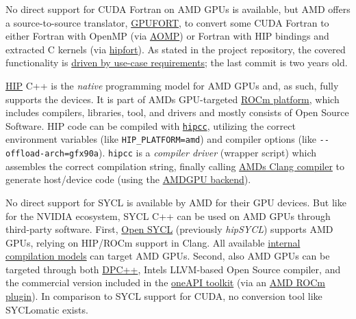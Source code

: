  No direct support for CUDA Fortran on AMD GPUs is available, but AMD offers a source-to-source translator, \href{https://github.com/ROCmSoftwarePlatform/gpufort}{GPUFORT}, to convert some CUDA Fortran to either Fortran with OpenMP (via \href{https://github.com/ROCm-Developer-Tools/aomp}{AOMP}) or Fortran with HIP bindings and extracted C kernels (via \href{https://github.com/ROCmSoftwarePlatform/hipfort}{hipfort}). As stated in the project repository, the covered functionality is \href{https://github.com/ROCmSoftwarePlatform/gpufort\#limitations}{driven by use-case requirements}; the last commit is two years old.   

 \href{https://github.com/ROCm-Developer-Tools/HIP}{HIP} C++ is the \emph{native} programming model for AMD GPUs and, as such, fully supports the devices. It is part of AMD\textquotesingle s GPU-targeted \href{https://rocm.docs.amd.com/en/latest/}{ROCm platform}, which includes compilers, libraries, tool, and drivers and mostly consists of Open Source Software. HIP code can be compiled with \href{https://github.com/ROCm-Developer-Tools/HIPCC}{\texttt{hipcc}}, utilizing the correct environment variables (like \texttt{HIP\_PLATFORM=amd}) and compiler options (like \texttt{-\/-offload-arch=gfx90a}). \texttt{hipcc} is a \emph{compiler driver} (wrapper script) which assembles the correct compilation string, finally calling \href{https://github.com/RadeonOpenCompute/llvm-project}{AMD\textquotesingle s Clang compiler} to generate host/device code (using the \href{https://llvm.org/docs/AMDGPUUsage.html}{AMDGPU backend}).   

 No direct support for SYCL is available by AMD for their GPU devices. But like for the NVIDIA ecosystem, SYCL C++ can be used on AMD GPUs through third-party software. First, \href{https://github.com/OpenSYCL/OpenSYCL}{Open SYCL} (previously \emph{hipSYCL}) supports AMD GPUs, relying on HIP/ROCm support in Clang. All available \href{https://github.com/OpenSYCL/OpenSYCL/blob/develop/doc/compilation.md}{internal compilation models} can target AMD GPUs. Second, also AMD GPUs can be targeted through both \href{https://github.com/intel/llvm/blob/sycl/sycl/doc/GetStartedGuide.md\#build-dpc-toolchain-with-support-for-hip-amd}{DPC++}, Intel\textquotesingle s LLVM-based Open Source compiler, and the commercial version included in the \href{https://www.intel.com/content/www/us/en/developer/tools/oneapi/dpc-compiler.html}{oneAPI toolkit} (via an \href{https://developer.codeplay.com/products/oneapi/amd/2023.2.1/guides/get-started-guide-amd}{AMD ROCm plugin}). In comparison to SYCL support for CUDA, no conversion tool like SYCLomatic exists.   

